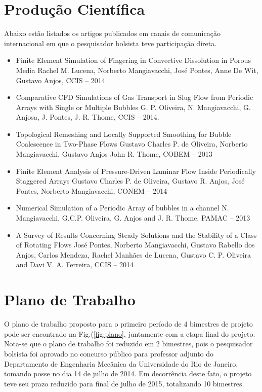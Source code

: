 \documentclass[a4paper,portuges]{article}
\begin{document}
\section{Produção Científica}
Abaixo estão listados os artigos publicados em canais de comunicação
internacional em que o pesquisador bolsista teve participação direta.

\begin{itemize}
	\item Finite Element Simulation of Fingering in Convective Dissolution in
	      Porous Media Rachel M. Lucena, Norberto Mangiavacchi, José Pontes,
	      Anne De Wit, Gustavo Anjos, CCIS -- 2014
	\item Comparative CFD Simulations of Gas Transport in Slug Flow from
		  Periodic Arrays with Single or Multiple Bubbles G. P.
		  Oliveira, N. Mangiavacchi, G. Anjosa, J. Pontes, J. R. Thome,
		  CCIS -- 2014.
	\item Topological Remeshing and Locally Supported Smoothing for
	      Bubble Coalescence in Two-Phase Flows
		  Gustavo Charles P. de Oliveira, Norberto Mangiavacchi, Gustavo Anjos
		  John R. Thome, COBEM -- 2013
	\item Finite Element Analysis of Pressure-Driven Laminar Flow Inside
	      Periodically Staggered Arrays
		  Gustavo Charles P. de Oliveira, Gustavo R. Anjos, José Pontes,
		  Norberto Mangiavacchi, CONEM -- 2014
	\item Numerical Simulation of a Periodic Array of bubbles in a
	      channel
	      N. Mangiavacchi, G.C.P. Oliveira, G. Anjos and J. R. Thome,
		  PAMAC -- 2013
	\item A Survey of Results Concerning Steady Solutions and the
	      Stability of a Class of Rotating Flows
		  José Pontes, Norberto Mangiavacchi, Gustavo Rabello dos Anjos,
		  Carlos Mendeza, Rachel Manhães de Lucena, Gustavo C. P.
		  Oliveira and Davi V. A. Ferreira, CCIS -- 2014
\end{itemize}

\section{Plano de Trabalho}
O plano de trabalho proposto para o primeiro período de 4 bimestres de
projeto pode ser encontrado na Fig.(\ref{fig:plano}, juntamente com a
etapa final do projeto. Nota-se que o plano de trabalho foi reduzido em
2 bimestres, pois o pesquisador bolsista foi aprovado no concurso
público para professor adjunto do Departamento de Engenharia Mecânica da
Universidade do Rio de Janeiro, tomando posse no dia 14 de julho de
2014. Em decorrência deste fato, o projeto teve seu prazo reduzido para
final de julho de 2015, totalizando 10 bimestres. 
\end{document}
